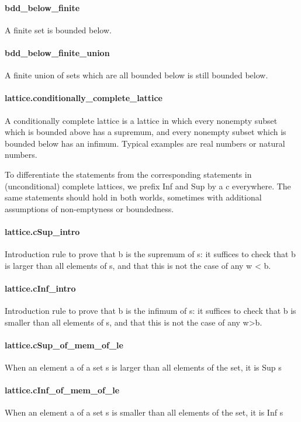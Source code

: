 \documentclass{article}
\begin{document}
\paragraph{bdd\_below\_finite}
\par
A finite set is bounded below.
\paragraph{bdd\_below\_finite\_union}
\par
A finite union of sets which are all bounded below is still bounded below.
\paragraph{lattice.conditionally\_complete\_lattice}
\par
A conditionally complete lattice is a lattice in which
every nonempty subset which is bounded above has a supremum, and
every nonempty subset which is bounded below has an infimum.
Typical examples are real numbers or natural numbers.
\par
To differentiate the statements from the corresponding statements in (unconditional)
complete lattices, we prefix Inf and Sup by a c everywhere. The same statements should
hold in both worlds, sometimes with additional assumptions of non-emptyness or
boundedness.
\paragraph{lattice.cSup\_intro}
\par
Introduction rule to prove that b is the supremum of s: it suffices to check that b
is larger than all elements of s, and that this is not the case of any w
<
b.
\paragraph{lattice.cInf\_intro}
\par
Introduction rule to prove that b is the infimum of s: it suffices to check that b
is smaller than all elements of s, and that this is not the case of any w>b.
\paragraph{lattice.cSup\_of\_mem\_of\_le}
\par
When an element a of a set s is larger than all elements of the set, it is Sup s
\paragraph{lattice.cInf\_of\_mem\_of\_le}
\par
When an element a of a set s is smaller than all elements of the set, it is Inf s
\end{document}
